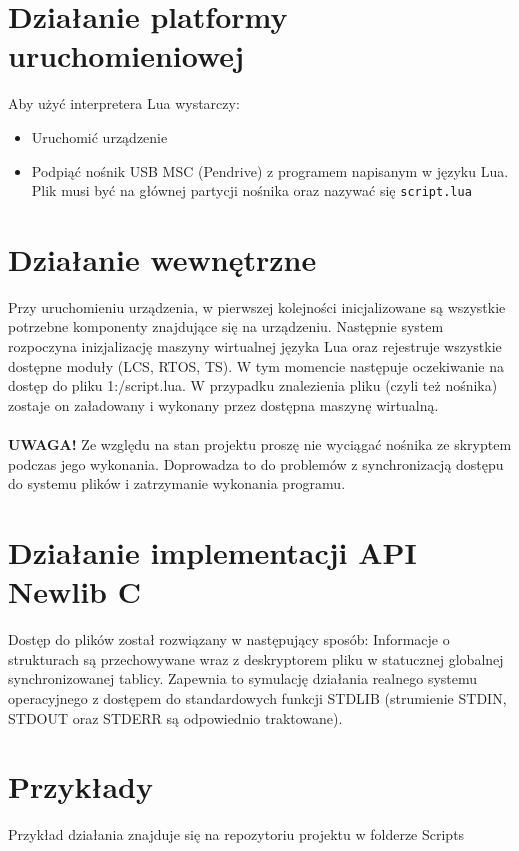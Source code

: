 \documentclass{article}
\begin{document}
\section{Działanie platformy uruchomieniowej}
Aby użyć interpretera Lua wystarczy:
\begin{itemize}
  \item Uruchomić urządzenie
  \item Podpiąć nośnik USB MSC (Pendrive) z programem napisanym w języku Lua. Plik musi być na głównej partycji nośnika oraz nazywać się \texttt{script.lua}
\end{itemize}

\section{Działanie wewnętrzne}
Przy uruchomieniu urządzenia, w pierwszej kolejności inicjalizowane są wszystkie potrzebne komponenty znajdujące się na urządzeniu.
Następnie system rozpoczyna inizjalizację maszyny wirtualnej języka Lua oraz rejestruje wszystkie dostępne moduły (LCS, RTOS, TS). 
W tym momencie następuje oczekiwanie na dostęp do pliku 1:/script.lua. W przypadku znalezienia pliku (czyli też nośnika) zostaje on 
załadowany i wykonany przez dostępna maszynę wirtualną.\\
\\
\textbf{UWAGA!} Ze względu na stan projektu proszę nie wyciągać nośnika ze skryptem podczas jego wykonania. 
Doprowadza to do problemów z synchronizacją dostępu do systemu plików i zatrzymanie wykonania programu.

\section{Działanie implementacji API Newlib C}
Dostęp do plików został rozwiązany w następujący sposób: Informacje o strukturach są przechowywane wraz z deskryptorem pliku w statucznej 
globalnej synchronizowanej tablicy. Zapewnia to symulację działania realnego systemu operacyjnego z dostępem do standardowych funkcji STDLIB 
(strumienie STDIN, STDOUT oraz STDERR są odpowiednio traktowane).

\section{Przykłady}
Przykład działania znajduje się na repozytoriu projektu w folderze Scripts
\end{document}
